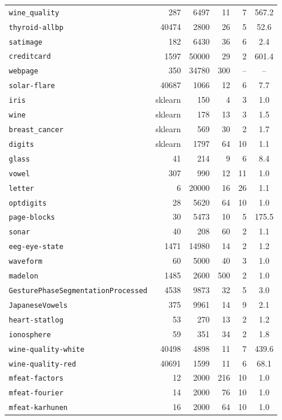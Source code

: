 \begin{longtable}{lrrrrc}
\texttt{wine\_quality} & 287 & 6497 & 11 & 7 & 567.2 \\
\texttt{thyroid-allbp} & 40474 & 2800 & 26 & 5 & 52.6 \\
\texttt{satimage} & 182 & 6430 & 36 & 6 & 2.4 \\
\texttt{creditcard} & 1597 & 50000 & 29 & 2 & 601.4 \\
\texttt{webpage} & 350 & 34780 & 300 & -- & -- \\
\texttt{solar-flare} & 40687 & 1066 & 12 & 6 & 7.7 \\
\texttt{iris} & sklearn & 150 & 4 & 3 & 1.0 \\
\texttt{wine} & sklearn & 178 & 13 & 3 & 1.5 \\
\texttt{breast\_cancer} & sklearn & 569 & 30 & 2 & 1.7 \\
\texttt{digits} & sklearn & 1797 & 64 & 10 & 1.1 \\
\texttt{glass} & 41 & 214 & 9 & 6 & 8.4 \\
\texttt{vowel} & 307 & 990 & 12 & 11 & 1.0 \\
\texttt{letter} & 6 & 20000 & 16 & 26 & 1.1 \\
\texttt{optdigits} & 28 & 5620 & 64 & 10 & 1.0 \\
\texttt{page-blocks} & 30 & 5473 & 10 & 5 & 175.5 \\
\texttt{sonar} & 40 & 208 & 60 & 2 & 1.1 \\
\texttt{eeg-eye-state} & 1471 & 14980 & 14 & 2 & 1.2 \\
\texttt{waveform} & 60 & 5000 & 40 & 3 & 1.0 \\
\texttt{madelon} & 1485 & 2600 & 500 & 2 & 1.0 \\
\texttt{GesturePhaseSegmentationProcessed} & 4538 & 9873 & 32 & 5 & 3.0 \\
\texttt{JapaneseVowels} & 375 & 9961 & 14 & 9 & 2.1 \\
\texttt{heart-statlog} & 53 & 270 & 13 & 2 & 1.2 \\
\texttt{ionosphere} & 59 & 351 & 34 & 2 & 1.8 \\
\texttt{wine-quality-white} & 40498 & 4898 & 11 & 7 & 439.6 \\
\texttt{wine-quality-red} & 40691 & 1599 & 11 & 6 & 68.1 \\
\texttt{mfeat-factors} & 12 & 2000 & 216 & 10 & 1.0 \\
\texttt{mfeat-fourier} & 14 & 2000 & 76 & 10 & 1.0 \\
\texttt{mfeat-karhunen} & 16 & 2000 & 64 & 10 & 1.0 \\

\end{longtable}
